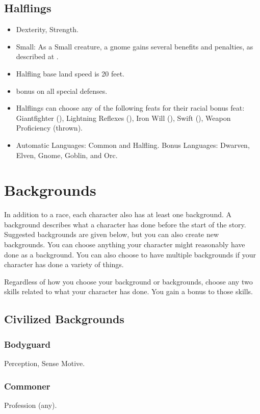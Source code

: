 \subsection{Halflings}
\begin{itemize}
\item {} Dexterity,  Strength.
\item Small: As a Small creature, a gnome gains several benefits and penalties, as described at .
\item Halfling base land speed is 20 feet.
\item {} bonus on all special defenses.
\item Halflings can choose any of the following feats for their racial bonus feat: Giantfighter (), Lightning Reflexes (), Iron Will (), Swift (), Weapon Proficiency (thrown).
\item Automatic Languages: Common and Halfling. Bonus Languages: Dwarven, Elven, Gnome, Goblin, and Orc.
\end{itemize}

\section{Backgrounds}
In addition to a race, each character also has at least one background. A background describes what a character has done before the start of the story. Suggested backgrounds are given below, but you can also create new backgrounds. You can choose anything your character might reasonably have done as a background. You can also choose to have multiple backgrounds if your character has done a variety of things.

Regardless of how you choose your background or backgrounds, choose any two skills related to what your character has done. You gain a  bonus to those skills.

\subsection{Civilized Backgrounds}

\subsubsection{Bodyguard}
 Perception, Sense Motive.

\subsubsection{Commoner}
 Profession (any).

